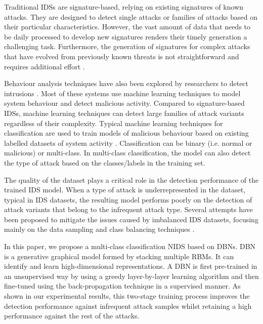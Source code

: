 \documentclass[runningheads]{llncs}
\begin{document}
Traditional \acfp{IDS} are signature-based, relying on existing signatures of known attacks. They are designed to detect single attacks or families of attacks based on their particular characteristics. However, the vast amount of data that needs to be daily processed to develop new signatures renders their timely generation a challenging task. Furthermore, the generation of signatures for complex attacks that have evolved from previously known threats is not straightforward and requires additional effort \cite{Zhongw}.

Behaviour analysis techniques have also been explored by researchers to detect intrusions \cite{Zhongw}. Most of these systems use machine learning techniques to model system behaviour and detect malicious activity. Compared to signature-based \acp{IDS}, machine learning techniques can detect large families of attack variants regardless of their complexity. Typical machine learning techniques for classification are used to train models of malicious behaviour based on existing labelled datasets of system activity \cite{Alqatf,KUNANG2021102804}. Classification can be binary (i.e. normal or  malicious) or multi-class. In multi-class classification, the model can also detect the type of attack based on the classes/labels in the training set. 

The quality of the dataset plays a critical role in the detection performance of the trained \ac{IDS} model. When a type of attack is underrepresented in the dataset, typical in \ac{IDS} datasets, the resulting model performs poorly on the detection of attack variants that belong to the infrequent attack type. Several attempts have been proposed to mitigate the issues caused by imbalanced \ac{IDS} datasets, focusing mainly on the data sampling and class balancing techniques \cite{Sarpe}.

In this paper, we propose a multi-class classification \ac{NIDS} based on \acfp{DBN}\footnotemark{}. \ac{DBN} is a generative graphical model formed by stacking multiple \acp{RBM}. It can identify and learn high-dimensional representations. A \ac{DBN} is first pre-trained in an unsupervised way by using a greedy layer-by-layer learning algorithm  and then fine-tuned using the back-propagation technique in a supervised manner. As shown in our experimental results, this two-stage training process improves the detection performance against infrequent attack samples whilst retaining a high performance against the rest of the attacks.
\end{document}

